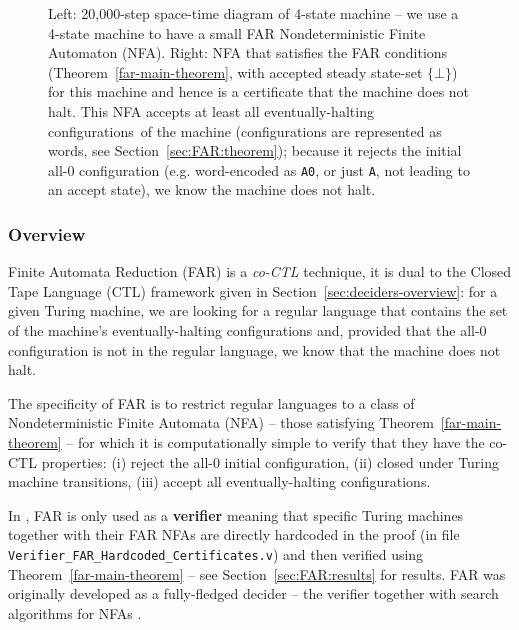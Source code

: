 \begin{figure}[h]
\begin{subfigure}[t]{0.5\textwidth}
        \label{fig:far_nfa}
    \end{subfigure}
    \caption[Short caption]{{\small Left: 20,000-step space-time diagram of 4-state machine  -- we use a 4-state machine to have a small FAR Nondeterministic Finite Automaton (NFA). Right: NFA that satisfies the FAR conditions (Theorem~\ref{far-main-theorem}, with accepted steady state-set $\{\bot\}$) for this machine and hence is a certificate that the machine does not halt. This NFA accepts at least all eventually-halting configurations\footnotemark ~of the machine (configurations are represented as words, see Section~\ref{sec:FAR:theorem}); because it rejects the initial all-0 configuration (e.g. word-encoded as \texttt{A0}, or just \texttt{A}, not leading to an accept state), we know the machine does not halt.}}
    \label{fig:finite-automata-reduction}
\end{figure}

\vspace{-1em}
\subsubsection{Overview}

\newcommand{\M}{M}
\newcommand{\T}{^{T}}

Finite Automata Reduction (FAR) is a \textit{co-CTL} technique, \ie it is dual to the Closed Tape Language (CTL) framework given in Section~\ref{sec:deciders-overview}: for a given Turing machine, we are looking for a regular language that contains the set of the machine's eventually-halting configurations and, provided that the all-0 configuration is not in the regular language, we know that the machine does not halt.

The specificity of FAR is to restrict regular languages to a class of Nondeterministic Finite Automata (NFA) -- those satisfying Theorem~\ref{far-main-theorem} -- for which it is computationally simple to verify that they have the co-CTL properties: (i) reject the all-0 initial configuration, (ii) closed under Turing machine transitions, (iii) accept all eventually-halting configurations.

In \CoqBB, FAR is only used as a \textbf{verifier} meaning that specific Turing machines together with their FAR NFAs are directly hardcoded in the proof (in file \texttt{Verifier\_FAR\_Hardcoded\_Certificates.v}) and then verified using Theorem~\ref{far-main-theorem} -- see Section~\ref{sec:FAR:results} for results. FAR was originally developed as a fully-fledged decider -- \ie the verifier together with search algorithms for NFAs \cite{FAR,bbchallenge_part1}.

